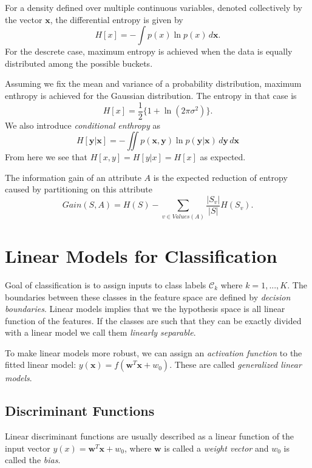 \documentclass[11pt]{article}
\begin{document}
For a density defined over multiple continuous variables, denoted collectively
by the vector $\textbf{x}$, the differential entropy is given by
\begin{equation*}
  H[x] = -\int p(x) \ln p(x) \,d\textbf{x}.
\end{equation*}
For the descrete case, maximum entropy is achieved when the data is equally
distributed among the possible buckets.

Assuming we fix the mean and variance of a probability distribution, maximum
enthropy is achieved for the Gaussian distribution. The entropy in that case
is
\begin{equation*}
  H[x] = \frac{1}{2} \{1+\ln (2\pi \sigma^2)\}.
\end{equation*}
We also introduce \textit{conditional enthropy} as
\begin{equation*}
  H[\textbf{y}|\textbf{x}] = -\iint p(\textbf{x}, \textbf{y}) \ln
  p(\textbf{y}|\textbf{x}) \,d\textbf{y} \,d\textbf{x}
\end{equation*}
From here we see that $H[x, y] = H[y|x] = H[x]$ as expected.

The information gain of an attribute $A$ is the expected reduction of entropy
caused by partitioning on this attribute
\begin{equation*}
  Gain(S, A) = H(S) - \sum_{v \in Values(A)} \frac{|S_v|}{|S|} H(S_v).
\end{equation*}
\section{Linear Models for Classification}
Goal of classification is to assign inputs to class labels $\mathcal{C}_k$
where $k = 1, ..., K$. The boundaries between these classes in the feature
space are defined by \textit{decision boundaries}. Linear models implies that
we the hypothesis space is all linear function of the features. If the classes
are such that they can be exactly divided with a linear model we call them
\textit{linearly separable}.

To make linear models more robust, we can assign an \textit{activation function}
to the fitted linear model: $y(\textbf{x})=f(\textbf{w}^T\textbf{x} + w_0)$.
These are called \textit{generalized linear models}.

\subsection{Discriminant Functions}
Linear discriminant functions are usually described as a linear function of
the input vector $y(x) = \textbf{w}^T\textbf{x} + w_0$, where $\textbf{w}$ is
called a \textit{weight vector} and $w_0$ is called the \textit{bias}.
\end{document}
